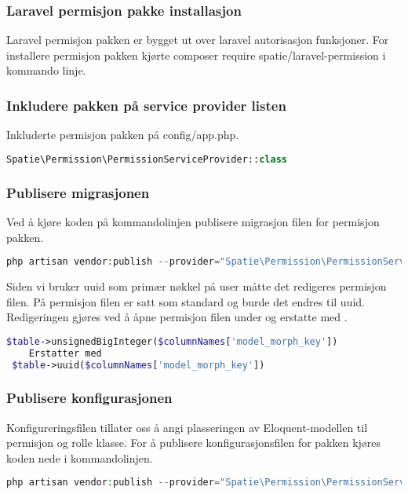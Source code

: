 \subsubsection{Laravel permisjon pakke installasjon} 
Laravel permisjon pakken er bygget ut over laravel autorisasjon funksjoner\cite{laravelnewsn2017tblp}.
For installere permisjon pakken kjørte composer require spatie/laravel-permission i kommando linje.

\subsubsection{Inkludere pakken på service provider listen}
Inkluderte permisjon pakken på config/app.php. 
\begin{lstlisting}[language=PHP]
    Spatie\Permission\PermissionServiceProvider::class
\end{lstlisting}

\subsubsection{Publisere migrasjonen}
Ved å kjøre koden på kommandolinjen publisere migrasjon filen for permisjon pakken.
\begin{lstlisting}[language=PHP]
   php artisan vendor:publish --provider="Spatie\Permission\PermissionServiceProvider" --tag="migrations" 
\end{lstlisting}

Siden vi bruker uuid som primær nøkkel på user måtte det redigeres permisjon filen. På permisjon filen er satt  som standard og burde det endres til uuid. Redigeringen gjøres ved å åpne permisjon filen  under  og erstatte  med .
\begin{lstlisting}[language=PHP]
  $table->unsignedBigInteger($columnNames['model_morph_key'])
    Erstatter med 
 $table->uuid($columnNames['model_morph_key'])
\end{lstlisting}

\subsubsection{Publisere konfigurasjonen}
Konfigureringsfilen tillater oss å angi plasseringen av Eloquent-modellen til permisjon og rolle klasse.
For å publisere konfigurasjonsfilen for pakken kjøres koden nede i kommandolinjen.

\begin{lstlisting}[language=PHP]
  php artisan vendor:publish --provider="Spatie\Permission\PermissionServiceProvider" --tag="config"
\end{lstlisting}

